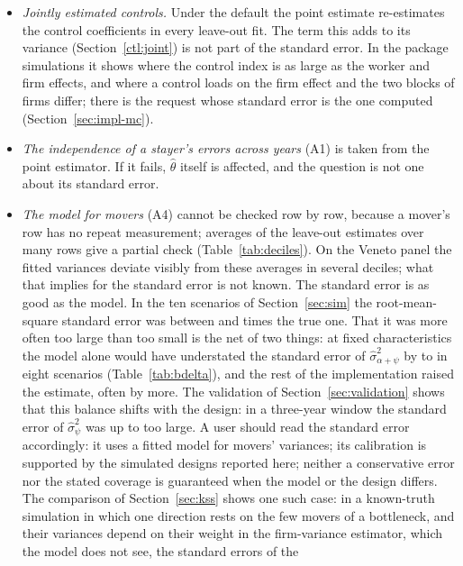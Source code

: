 \begin{itemize}
\item \emph{Jointly estimated controls.} Under the default  the point estimate re-estimates
the control coefficients in every leave-out fit. The term this adds to its variance (Section~\ref{ctl:joint}) is not
part of the standard error. In the package simulations it shows where the control index is as large as the worker
and firm effects, and where a control loads on the firm effect and the two blocks of firms differ; there
 is the request whose standard error is the one computed (Section~\ref{sec:impl-mc}).
\item \emph{The independence of a stayer's errors across years} (A1) is taken from the point estimator. If it
fails, $\hat\theta$ itself is affected, and the question is not one about its standard error.
\item \emph{The model for movers} (A4) cannot be checked row by row, because a mover's row has no repeat
measurement; averages of the leave-out estimates over many rows give a partial check
(Table~\ref{tab:deciles}). On the Veneto panel the fitted variances deviate visibly from these averages in
several deciles; what that implies for the standard error is not known. The standard error is as good as the
model. In the ten scenarios of Section~\ref{sec:sim} the root-mean-square standard error was between
 and  times the true one. That it was more often too large than too small is the
net of two things: at fixed characteristics the model alone would have understated the standard error of
$\hat\sigma^2_{\alpha+\psi}$ by  to  in eight scenarios
(Table~\ref{tab:bdelta}), and the rest of the implementation raised the estimate, often by more. The
validation of Section~\ref{sec:validation} shows that this balance shifts with the design: in a three-year
window the standard error of $\hat\sigma^2_\psi$ was up to  too large. A
user should read the standard error accordingly: it uses a fitted model for movers' variances; its calibration
is supported by the simulated designs reported here; neither a conservative error nor the stated coverage is
guaranteed when the model or the design differs. The comparison of Section~\ref{sec:kss} shows one such case: in
a known-truth simulation in which one direction rests on the few movers of a bottleneck, and their variances
depend on their weight in the firm-variance estimator, which the model does not see, the standard errors of the

\end{itemize}
